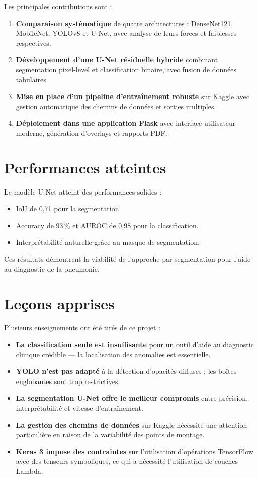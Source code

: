 \documentclass[12pt,a4paper,twoside]{report}
\begin{document}
Les principales contributions sont :

\begin{enumerate}
  \item \textbf{Comparaison systématique} de quatre architectures : DenseNet121, MobileNet, YOLOv8 et U-Net, avec analyse de leurs forces et faiblesses respectives.
  \item \textbf{Développement d'une U-Net résiduelle hybride} combinant segmentation pixel-level et classification binaire, avec fusion de données tabulaires.
  \item \textbf{Mise en place d'un pipeline d'entraînement robuste} sur Kaggle avec gestion automatique des chemins de données et sorties multiples.
  \item \textbf{Déploiement dans une application Flask} avec interface utilisateur moderne, génération d'overlays et rapports PDF.
\end{enumerate}

\section{Performances atteintes}

Le modèle U-Net atteint des performances solides :
\begin{itemize}
  \item IoU de 0,71 pour la segmentation.
  \item Accuracy de 93\,\% et AUROC de 0,98 pour la classification.
  \item Interprétabilité naturelle grâce au masque de segmentation.
\end{itemize}

Ces résultats démontrent la viabilité de l'approche par segmentation pour l'aide au diagnostic de la pneumonie.

\section{Leçons apprises}

Plusieurs enseignements ont été tirés de ce projet :

\begin{itemize}
  \item \textbf{La classification seule est insuffisante} pour un outil d'aide au diagnostic clinique crédible — la localisation des anomalies est essentielle.
  \item \textbf{YOLO n'est pas adapté} à la détection d'opacités diffuses ; les boîtes englobantes sont trop restrictives.
  \item \textbf{La segmentation U-Net offre le meilleur compromis} entre précision, interprétabilité et vitesse d'entraînement.
  \item \textbf{La gestion des chemins de données} sur Kaggle nécessite une attention particulière en raison de la variabilité des points de montage.
  \item \textbf{Keras 3 impose des contraintes} sur l'utilisation d'opérations TensorFlow avec des tenseurs symboliques, ce qui a nécessité l'utilisation de couches Lambda.
\end{itemize}
\end{document}
